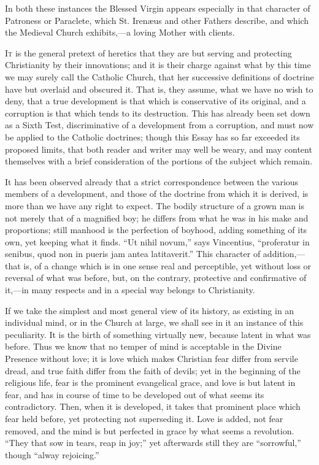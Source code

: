 In both these instances the Blessed Virgin appears especially in
that character of Patroness or Paraclete, which St. Irenæus and other
Fathers describe, and which the Medieval Church exhibits,—a loving
Mother with clients.


I\textsc{t} is the general pretext of heretics that they are but serving and
protecting Christianity by their innovations; and it is their charge
against what by this time we may surely call the Catholic Church, that
her successive definitions of doctrine have but overlaid and obscured
it. That is, they assume, what we have no wish to deny, that a true
development is that which is conservative of its original, and a
corruption is that which tends to its destruction. This has already
been set down as a Sixth Test, discriminative of a development from a
corruption, and must now be applied to the Catholic doctrines; though
this Essay has so far exceeded its proposed limits, that both reader
and writer may well be weary, and may content themselves with a brief
consideration of the portions of the subject which remain.

It has been observed already that a strict correspondence between
the various members of a development, and those of the doctrine from
which it is derived, is more than we have any right to expect. The
bodily structure of a grown man is not merely that of a magnified boy;
he differs from what he was in his make and proportions; still manhood
is the perfection of boyhood, adding something of its own, yet keeping
what it finds. ``Ut nihil novum,'' says Vincentius, ``proferatur
in senibus, quod non in pueris jam antea latitaverit.'' This
character of addition,—that is, of a change which is in one sense
real and perceptible, yet without loss or reversal of what was before,
but, on the contrary, protective and confirmative of it,—in many
respects and in a special way belongs to Christianity.


If we take the simplest and most general view of its history, as
existing in an individual mind, or in the Church at large, we shall
see in it an instance of this peculiarity. It is the birth of
something virtually new, because latent in what was before. Thus we
know that no temper of mind is acceptable in the Divine Presence
without love; it is love which makes Christian fear differ from
servile dread, and true faith differ from the faith of devils; yet in
the beginning of the religious life, fear is the prominent evangelical
grace, and love is but latent in fear, and has in course of time to be
developed out of what seems its contradictory. Then, when it is
developed, it takes that prominent place which fear held before, yet
protecting not superseding it. Love is added, not fear removed, and
the mind is but perfected in grace by what seems a revolution.
``They that sow in tears, reap in joy;'' yet afterwards still
they are ``sorrowful,'' though ``alway rejoicing.''

